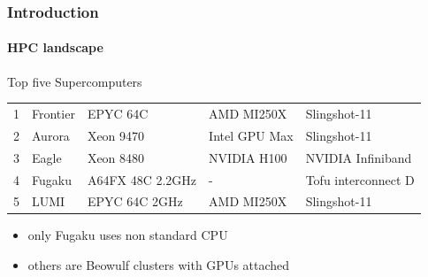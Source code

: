 \documentclass[aspectratio=169]{beamer}
\begin{document}
\begin{frame}[fragile]
\frametitle{Introduction}
\framesubtitle{HPC landscape}
\begin{block}{Top five Supercomputers}
\begin{table}
\begin{tabular}{c|l|l|l|l}
1 &	Frontier& EPYC 64C &AMD MI250X &Slingshot-11 \\
2 &	Aurora  & Xeon 9470 & Intel GPU Max&Slingshot-11 \\
3 &	Eagle & Xeon 8480 &  NVIDIA H100 & NVIDIA Infiniband \\
\rowcolor{backcolour}
4 &	Fugaku &  A64FX 48C 2.2GHz & - & Tofu interconnect D \\
5 &	LUMI &  EPYC 64C 2GHz & AMD MI250X & Slingshot-11 
\end{tabular}
\end{table}
\begin{itemize}
  \item only Fugaku uses non standard CPU
  \item others are Beowulf clusters with GPUs attached
\end{itemize}
\end{block}
\end{frame}
\end{document}
